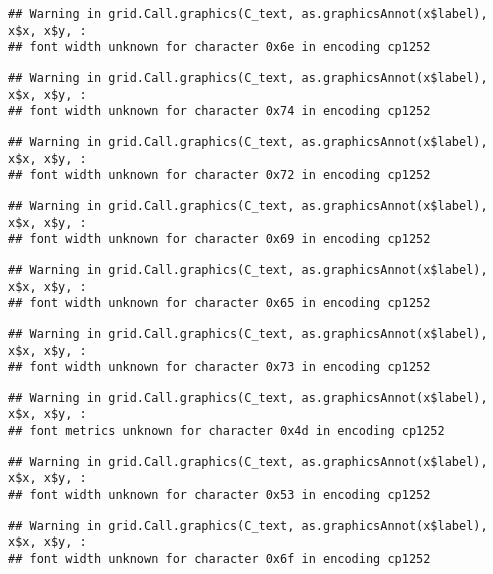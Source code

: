 \documentclass[
]{article}
\begin{document}
\begin{verbatim}
## Warning in grid.Call.graphics(C_text, as.graphicsAnnot(x$label), x$x, x$y, :
## font width unknown for character 0x6e in encoding cp1252
\end{verbatim}

\begin{verbatim}
## Warning in grid.Call.graphics(C_text, as.graphicsAnnot(x$label), x$x, x$y, :
## font width unknown for character 0x74 in encoding cp1252
\end{verbatim}

\begin{verbatim}
## Warning in grid.Call.graphics(C_text, as.graphicsAnnot(x$label), x$x, x$y, :
## font width unknown for character 0x72 in encoding cp1252
\end{verbatim}

\begin{verbatim}
## Warning in grid.Call.graphics(C_text, as.graphicsAnnot(x$label), x$x, x$y, :
## font width unknown for character 0x69 in encoding cp1252
\end{verbatim}

\begin{verbatim}
## Warning in grid.Call.graphics(C_text, as.graphicsAnnot(x$label), x$x, x$y, :
## font width unknown for character 0x65 in encoding cp1252
\end{verbatim}

\begin{verbatim}
## Warning in grid.Call.graphics(C_text, as.graphicsAnnot(x$label), x$x, x$y, :
## font width unknown for character 0x73 in encoding cp1252
\end{verbatim}

\begin{verbatim}
## Warning in grid.Call.graphics(C_text, as.graphicsAnnot(x$label), x$x, x$y, :
## font metrics unknown for character 0x4d in encoding cp1252
\end{verbatim}

\begin{verbatim}
## Warning in grid.Call.graphics(C_text, as.graphicsAnnot(x$label), x$x, x$y, :
## font width unknown for character 0x53 in encoding cp1252
\end{verbatim}

\begin{verbatim}
## Warning in grid.Call.graphics(C_text, as.graphicsAnnot(x$label), x$x, x$y, :
## font width unknown for character 0x6f in encoding cp1252
\end{verbatim}
\end{document}
